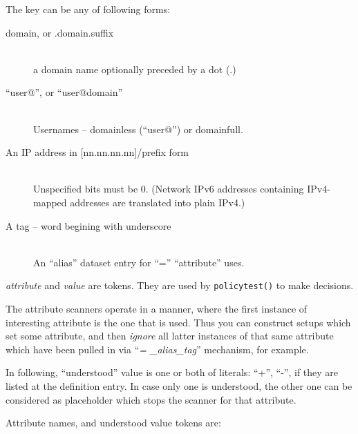 The key can be any of following forms:
\begin{description}
\item[\rm domain, or .domain.suffix] \mbox{} \\
a domain name optionally preceded by a dot (.)

\item[\rm``user@'', or ``user@domain''] \mbox{} \\
Usernames -- domainless (``user@'') or domainfull.

\item[\rm An IP address in {[}nn.nn.nn.nn{]}/prefix form] \mbox{} \\
Unspecified bits must be 0.
(Network IPv6 addresses containing IPv4-mapped addresses are translated
 into plain IPv4.)

\item[\rm A tag -- word begining with underscore] \mbox{} \\
An ``alias'' dataset entry for ``='' ``attribute'' uses.
\end{description}


{\em attribute} and {\em value} are tokens.
They are used by {\tt policytest()} to make decisions.

The attribute scanners operate in a manner, where the first
instance of interesting attribute is the one that is used.
Thus you can construct setups which set some attribute, and
then {\em ignore} all latter instances of that same attribute
which have been pulled in via ``{\em = \_alias\_tag}'' mechanism,
for example.

In following, ``understood'' value is one or both of literals: ``+'', ``-'',
if they are listed at the definition entry.
In case only one is understood, the other one can be considered as
placeholder which stops the scanner for that attribute.

Attribute names, and understood value tokens are:

